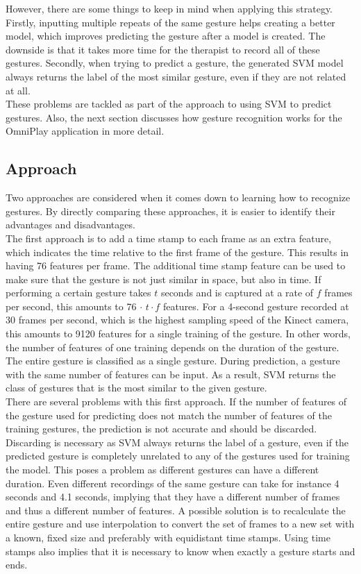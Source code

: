 However, there are some things to keep in mind when applying this strategy. Firstly, inputting multiple repeats of the same gesture helps creating a better model, which improves predicting the gesture after a model is created. The downside is that it takes more time for the therapist to record all of these gestures. Secondly, when trying to predict a gesture, the generated SVM model always returns the label of the most similar gesture, even if they are not related at all.\\

These problems are tackled as part of the approach to using SVM to predict gestures. Also, the next section discusses how gesture recognition works for the OmniPlay application in more detail.


\subsection{Approach}

Two approaches are considered when it comes down to learning how to recognize gestures. By directly comparing these approaches, it is easier to identify their advantages and disadvantages.\\

The first approach is to add a time stamp to each frame as an extra feature, which indicates the time relative to the first frame of the gesture. This results in having 76 features per frame. The additional time stamp feature can be used to make sure that the gesture is not just similar in space, but also in time. If performing a certain gesture takes $t$ seconds and is captured at a rate of $f$ frames per second, this amounts to 76 $\cdot$ $t \cdot f$ features. For a 4-second gesture recorded at 30 frames per second, which is the highest sampling speed of the Kinect camera, this amounts to 9120 features for a single training of the gesture. In other words, the number of features of one training depends on the duration of the gesture. The entire gesture is classified as a single gesture. During prediction, a gesture with the same number of features can be input. As a result, SVM returns the class of gestures that is the most similar to the given gesture.\\

There are several problems with this first approach. If the number of features of the gesture used for predicting does not match the number of features of the training gestures, the prediction is not accurate and should be discarded. Discarding is necessary as SVM always returns the label of a gesture, even if the predicted gesture is completely unrelated to any of the gestures used for training the model. This poses a problem as different gestures can have a different duration. Even different recordings of the same gesture can take for instance 4 seconds and 4.1 seconds, implying that they have a different number of frames and thus a different number of features. A possible solution is to recalculate the entire gesture and use interpolation to convert the set of frames to a new set with a known, fixed size and preferably with equidistant time stamps. Using time stamps also implies that it is necessary to know when exactly a gesture starts and ends.\\

